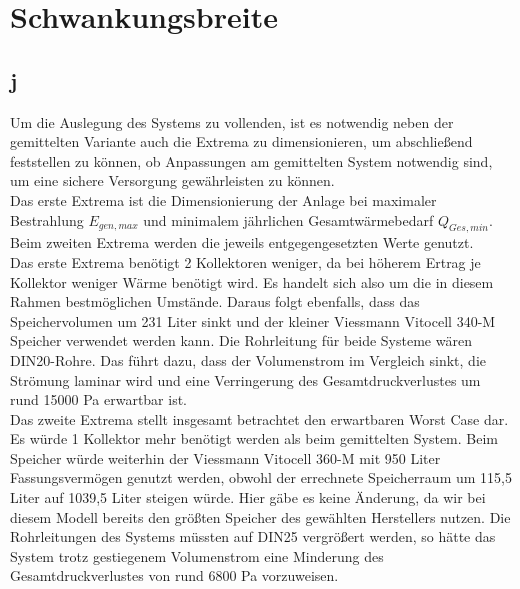 \section{Schwankungsbreite}
\label{sec:Schwankungsbreite}
\subsection{j}
Um die Auslegung des Systems zu vollenden, ist es notwendig neben der gemittelten
Variante auch die Extrema zu dimensionieren, um abschließend feststellen zu können, ob
Anpassungen am gemittelten System notwendig sind, um eine sichere Versorgung
gewährleisten zu können.\\
Das erste Extrema ist die Dimensionierung der Anlage bei maximaler Bestrahlung $E_{gen,max}$ und
minimalem jährlichen Gesamtwärmebedarf $Q_{Ges,min}$. Beim zweiten Extrema werden die jeweils entgegengesetzten
Werte genutzt.\\
Das erste Extrema benötigt 2 Kollektoren weniger, da bei höherem Ertrag je Kollektor weniger Wärme benötigt
wird. Es handelt sich also um die in diesem Rahmen bestmöglichen Umstände.
Daraus folgt ebenfalls, dass das Speichervolumen um 231 Liter sinkt und der kleiner Viessmann Vitocell 340-M Speicher
verwendet werden kann. Die Rohrleitung für beide Systeme wären DIN20-Rohre. Das führt dazu, dass der Volumenstrom
im Vergleich sinkt, die Strömung laminar wird und eine Verringerung des Gesamtdruckverlustes um rund 15000 Pa erwartbar ist.\\
Das zweite Extrema stellt insgesamt betrachtet den erwartbaren Worst Case dar.
Es würde 1 Kollektor mehr benötigt werden als beim gemittelten System. Beim Speicher würde weiterhin
der Viessmann Vitocell 360-M mit 950 Liter Fassungsvermögen genutzt werden, obwohl der errechnete Speicherraum
um 115,5 Liter auf 1039,5 Liter steigen würde. Hier gäbe es keine Änderung, da wir bei diesem Modell bereits den größten
Speicher des gewählten Herstellers nutzen. Die Rohrleitungen des Systems müssten auf DIN25 vergrößert werden, so
hätte das System trotz gestiegenem Volumenstrom eine Minderung des Gesamtdruckverlustes von rund 6800 Pa vorzuweisen.\\


